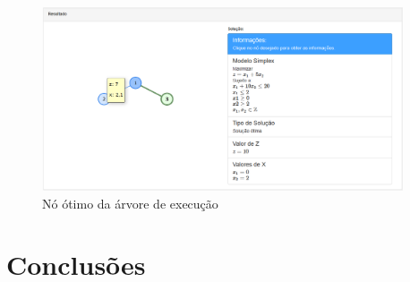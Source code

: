 \documentclass [11pt]{articleSBPO}
\begin{document}
\begin{figure}[!h]
	\centering
	\includegraphics[width=0.95\textwidth]{img/bbno3.png}
	\caption[]{Nó ótimo da árvore de execução}
	\label{fig:bbno3}
\end{figure}

\section{Conclusões}\label{sec:conclusao}



\end{document}

